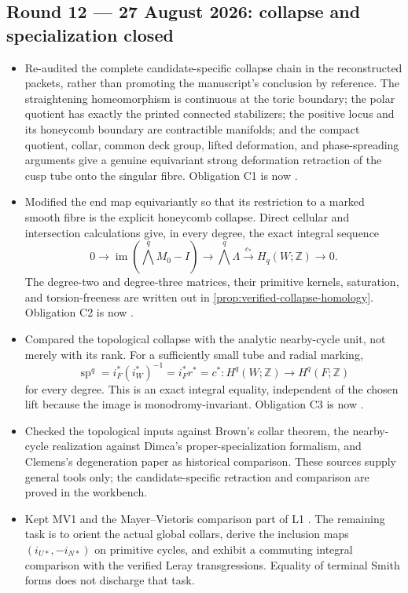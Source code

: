 \subsection*{Round 12 --- 27 August 2026: collapse and specialization closed}

\begin{itemize}[leftmargin=1.8em]
\item Re-audited the complete candidate-specific collapse chain in the
reconstructed packets, rather than promoting the manuscript's conclusion by
reference.  The straightening homeomorphism is continuous at the toric
boundary; the polar quotient has exactly the printed connected stabilizers;
the positive locus and its honeycomb boundary are contractible manifolds; and
the compact quotient, collar, common deck group, lifted deformation, and
phase-spreading arguments give a genuine equivariant strong deformation
retraction of the cusp tube onto the singular fibre.  Obligation C1 is now
\Verified.
\item Modified the end map equivariantly so that its restriction to a marked
smooth fibre is the explicit honeycomb collapse.  Direct cellular and
intersection calculations give, in every degree, the exact integral sequence
\[
0\longrightarrow\operatorname{im}(\textstyle\bigwedge^qM_0-I)
\longrightarrow\textstyle\bigwedge^q\Lambda
\xrightarrow{c_*}H_q(W;\mathbb Z)\longrightarrow0.
\]
The degree-two and degree-three matrices, their primitive kernels, saturation,
and torsion-freeness are written out in
\cref{prop:verified-collapse-homology}.  Obligation C2 is now \Verified.
\item Compared the topological collapse with the analytic nearby-cycle unit,
not merely with its rank.  For a sufficiently small tube and radial marking,
\[
\operatorname{sp}^q
=i_F^*(i_W^*)^{-1}=i_F^*r^*=c^*
:H^q(W;\mathbb Z)\longrightarrow H^q(F;\mathbb Z)
\]
for every degree.  This is an exact integral equality, independent of the
chosen lift because the image is monodromy-invariant.  Obligation C3 is now
\Verified.
\item Checked the topological inputs against Brown's collar theorem, the
nearby-cycle realization against Dimca's proper-specialization formalism, and
Clemens's degeneration paper as historical comparison.  These sources supply
general tools only; the candidate-specific retraction and comparison are
proved in the workbench.
\item Kept MV1 and the Mayer--Vietoris comparison part of L1 \Open.  The
remaining task is to orient the actual global collars, derive the inclusion
maps $(i_{U*},-i_{N*})$ on primitive cycles, and exhibit a commuting integral
comparison with the verified Leray transgressions.  Equality of terminal
Smith forms does not discharge that task.
\end{itemize}

